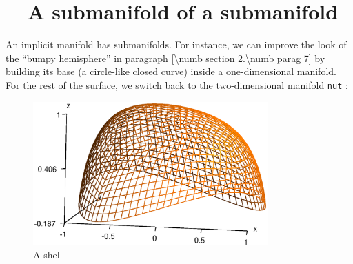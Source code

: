 \section{~~A submanifold of a submanifold}\label{\numb section 2.\numb parag 16}

An implicit manifold has submanifolds.
For instance, we can improve the look of the ``bumpy hemisphere'' in paragraph
\ref{\numb section 2.\numb parag 7} by building its base (a circle-like closed curve)
inside a one-dimensional manifold.
For the rest of the surface, we switch back to the two-dimensional manifold {\small\tt nut} :
\medskip

\begin{figure}[ht] \centering
  \includegraphics[width=90mm]{bumpy}
  \caption{A shell}
  \label{\numb section 2.\numb fig 18}
\end{figure}

